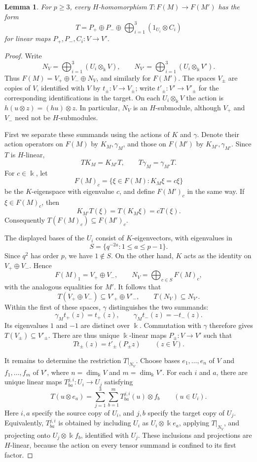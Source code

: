 \documentclass[10pt,oneside]{amsart}
\newcommand{\kk}{\Bbbk}
\newtheorem{lemma}[proposition]{Lemma}
\theoremstyle{definition}
\begin{document}
\begin{lemma}\label{lem:wild-hom-blocks}
For $p\ge3$, every $H$-homomorphism $T:F(M)\to F(M')$ has the form
\[
 T=P_+\oplus P_-\oplus\bigoplus_{i=1}^{3}(1_{U_i}\otimes C_i)
\]
for linear maps $P_+,P_-,C_i:V\to V'$.
\end{lemma}
\begin{proof}
Write
\[
 N_V=\bigoplus_{i=1}^3(U_i\otimes_{\kk}V),\qquad
 N_{V'}=\bigoplus_{i=1}^3(U_i\otimes_{\kk}V').
\]
Thus $F(M)=V_+\oplus V_-\oplus N_V$, and similarly for $F(M')$.
The spaces $V_\pm$ are copies of $V$, identified with $V$ by
$t_\pm:V\to V_\pm$; write $t'_\pm:V'\to V'_\pm$ for the corresponding
identifications in the target. On each $U_i\otimes_{\kk}V$ the action
is $h(u\otimes z)=(hu)\otimes z$. In particular, $N_V$ is an
$H$-submodule, although $V_+$ and $V_-$ need not be $H$-submodules.

First we separate these summands using the actions of $K$ and
$\gamma$. Denote their action operators on $F(M)$ by $K_M,\gamma_M$,
and those on $F(M')$ by $K_{M'},\gamma_{M'}$. Since $T$ is $H$-linear,
\[
 TK_M=K_{M'}T,\qquad T\gamma_M=\gamma_{M'}T.
\]
For $c\in\kk$, let
\[
 F(M)_c=\{\xi\in F(M):K_M\xi=c\xi\}
\]
be the $K$-eigenspace with eigenvalue $c$, and define $F(M')_c$
in the same way. If $\xi\in F(M)_c$, then
\[
 K_{M'}T(\xi)=T(K_M\xi)=cT(\xi).
\]
Consequently $T(F(M)_c)\subseteq F(M')_c$.

The displayed bases of the $U_i$ consist of $K$-eigenvectors, with
eigenvalues in
\[
 S=\{q^{-2a}:1\le a\le p-1\}.
\]
Since $q^2$ has order $p$, we have $1\notin S$. On the other hand,
$K$ acts as the identity on $V_+\oplus V_-$. Hence
\[
 F(M)_1=V_+\oplus V_-,
 \qquad N_V=\bigoplus_{c\in S}F(M)_c,
\]
with the analogous equalities for $M'$. It follows that
\[
 T(V_+\oplus V_-)\subseteq V'_+\oplus V'_-,
 \qquad T(N_V)\subseteq N_{V'}.
\]
Within the first of these spaces, $\gamma$ distinguishes the two
summands:
\[
 \gamma_Mt_+(z)=t_+(z),\qquad
 \gamma_Mt_-(z)=-t_-(z).
\]
Its eigenvalues $1$ and $-1$ are distinct over $\kk$. Commutation
with $\gamma$ therefore gives $T(V_\pm)\subseteq V'_\pm$.
There are thus unique $\kk$-linear maps $P_\pm:V\to V'$ such that
\[
 Tt_\pm(z)=t'_\pm(P_\pm z)\qquad(z\in V).
\]

It remains to determine the restriction $T|_{N_V}$. Choose bases
$e_1,\ldots,e_n$ of $V$ and $f_1,\ldots,f_m$ of $V'$, where
$n=\dim_{\kk}V$ and $m=\dim_{\kk}V'$. For each $i$ and $a$, there
are unique linear maps $T^{j,i}_{ba}:U_i\to U_j$ satisfying
\[
 T(u\otimes e_a)=
 \sum_{j=1}^3\sum_{b=1}^m T^{j,i}_{ba}(u)\otimes f_b
 \qquad(u\in U_i).
\]
Here $i,a$ specify the source copy of $U_i$, and $j,b$ specify the
target copy of $U_j$. Equivalently, $T^{j,i}_{ba}$ is obtained by
including $U_i$ as $U_i\otimes\kk e_a$, applying $T|_{N_V}$, and
projecting onto $U_j\otimes\kk f_b$, identified with $U_j$.
These inclusions and projections are $H$-linear, because the action
on every tensor summand is confined to its first factor.


\end{proof}
\end{document}
